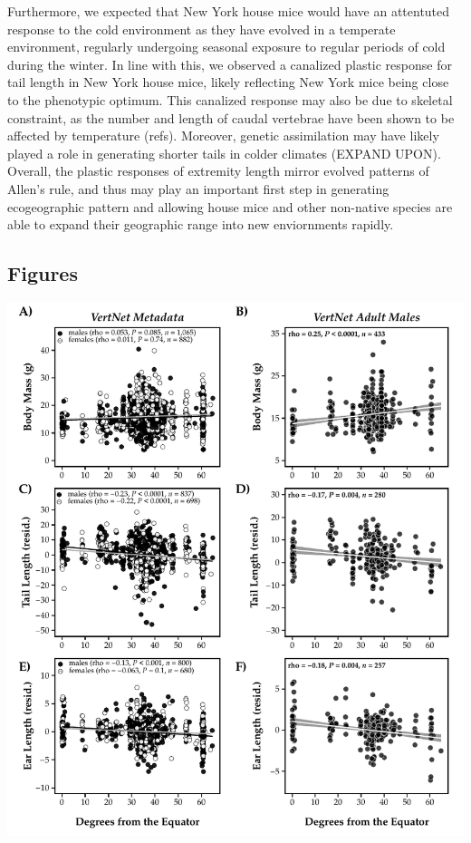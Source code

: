 \documentclass[]{article}
\begin{document}
Furthermore, we expected that New York house mice would have an
attentuted response to the cold environment as they have evolved in a
temperate environment, regularly undergoing seasonal exposure to regular
periods of cold during the winter. In line with this, we observed a
canalized plastic response for tail length in New York house mice,
likely reflecting New York mice being close to the phenotypic optimum.
This canalized response may also be due to skeletal constraint, as the
number and length of caudal vertebrae have been shown to be affected by
temperature (refs). Moreover, genetic assimilation may have likely
played a role in generating shorter tails in colder climates (EXPAND
UPON). Overall, the plastic responses of extremity length mirror evolved
patterns of Allen's rule, and thus may play an important first step in
generating ecogeographic pattern and allowing house mice and other
non-native species are able to expand their geographic range into new
enviornments rapidly.

\newpage

\hypertarget{figures}{%
\subsection{Figures}\label{figures}}

\includegraphics{../results/figures/VertNet_all.pdf}
\end{document}
